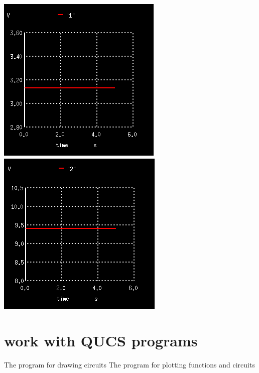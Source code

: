 \documentclass{report}
\begin{document}
\begin{center}
    \includegraphics[scale=0.4]{1.png}
    \includegraphics[scale=0.4]{2.png}
\end{center}

\section{work with QUCS programs}


\begin{thebibliography}{9}
The program for drawing circuits
The program for plotting functions and circuits
\end{thebibliography}
\end{document}

